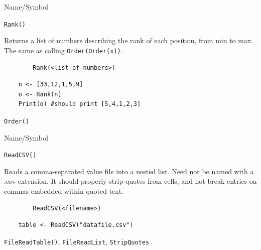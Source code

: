 \begin{desc}{Name/Symbol}
\item[Name/Symbol]	\verb+Rank()+

\item[Description]	Returns a list of numbers describing the rank of
  each position, from min to max.  The same as calling \verb+Order(Order(x))+.

\item[Usage]
\begin{verbatim}
		Rank(<list-of-numbers>)
\end{verbatim}

\item[Example]	
\begin{verbatim}
	n <- [33,12,1,5,9]
  	o <- Rank(n)
    Print(o) #should print [5,4,1,2,3]
\end{verbatim}

\item[See Also]	\verb+Order()+
\end{desc}
\begin{desc}{Name/Symbol}
\item[Name/Symbol]	\verb+ReadCSV()+

\item[Description]	Reads a comma-separated  value file into a nested
  list.  Need not be named with a .csv extension.  It should properly
  strip quotes from cells, and not break entries on commas embedded
  within quoted text.


\item[Usage]
\begin{verbatim}
		ReadCSV(<filename>)
\end{verbatim}

\item[Example]	
\begin{verbatim}
	table <- ReadCSV("datafile.csv")
\end{verbatim}

\item[See Also]	\verb+FileReadTable()+, \verb+FileReadList+, \verb+StripQuotes+
\end{desc}



